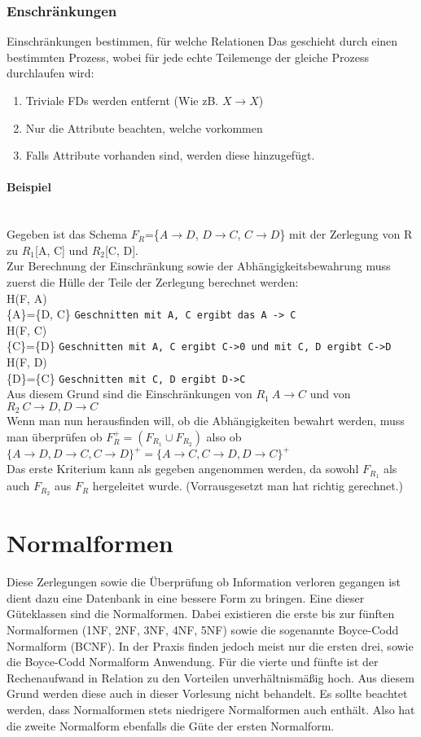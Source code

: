 \documentclass{article}
\newcommand{\paragraphlb}[1]{\paragraph{#1}\mbox{}\\}
\begin{document}
	\subsubsection{Enschränkungen}
	Einschränkungen bestimmen, für welche Relationen
	Das geschieht durch einen bestimmten Prozess, wobei für jede echte Teilemenge der gleiche Prozess durchlaufen wird:
	\begin{enumerate}
		\item{Triviale FDs werden entfernt (Wie zB. $X\to X$)}
		\item{Nur die Attribute beachten, welche vorkommen}
		\item{Falls Attribute vorhanden sind, werden diese hinzugefügt.}
	\end{enumerate}
	\paragraphlb{Beispiel}
	Gegeben ist das Schema $F_R$=\{$A\to D$, $D\to C$, $C\to D$\} mit der Zerlegung von R zu $R_1$[A, C] und $R_2$[C, D]. \\
	Zur Berechnung der Einschränkung sowie der Abhängigkeitsbewahrung muss zuerst die Hülle der Teile der Zerlegung berechnet werden: \\
	H(F, A)\\\{A\}=\{D, C\} \verb|Geschnitten mit A, C ergibt das A -> C|\\
	H(F, C)\\\{C\}=\{D\} \verb|Geschnitten mit A, C ergibt C->0 und mit C, D ergibt C->D|\\
	H(F, D)\\\{D\}=\{C\} \verb|Geschnitten mit C, D ergibt D->C|\\
	Aus diesem Grund sind die Einschränkungen von $R_1\ A\to C$ und von $R_2\ C\to D, D\to C$ \\
	Wenn man nun herausfinden will, ob die Abhängigkeiten bewahrt werden, muss man überprüfen ob $F^+_R=(F_{R_1}\cup F_{R_2})$ also ob $\{A\to D, D\to C, C\to D\}^+=\{A\to C, C\to D, D\to C\}^+$ \\
	Das erste Kriterium kann als gegeben angenommen werden, da sowohl $F_{R_1}$ als auch $F_{R_2}$ aus $F_R$ hergeleitet wurde. (Vorrausgesetzt man hat richtig gerechnet.) \\
	\section{Normalformen}
	Diese Zerlegungen sowie die Überprüfung ob Information verloren gegangen ist dient dazu eine Datenbank in eine bessere Form zu bringen. Eine dieser Güteklassen sind die Normalformen. Dabei existieren die erste bis zur fünften Normalformen (1NF, 2NF, 3NF, 4NF, 5NF) sowie die sogenannte Boyce-Codd Normalform (BCNF). In der Praxis finden jedoch meist nur die ersten drei, sowie die Boyce-Codd Normalform Anwendung. Für die vierte und fünfte ist der Rechenaufwand in Relation zu den Vorteilen unverhältnismäßig hoch. Aus diesem Grund werden diese auch in dieser Vorlesung nicht behandelt. Es sollte beachtet werden, dass Normalformen stets niedrigere Normalformen auch enthält. Also hat die zweite Normalform ebenfalls die Güte der ersten Normalform.
\end{document}
